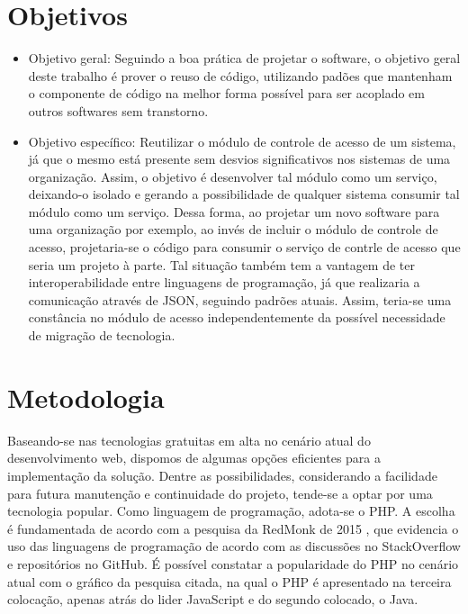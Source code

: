 \section{Objetivos}


\begin{itemize}
	\item Objetivo geral: Seguindo a boa prática de projetar o software, o objetivo geral deste trabalho é prover o reuso de código, utilizando padões que mantenham o componente de código na melhor forma possível para ser acoplado em outros softwares sem transtorno.
	\item Objetivo específico: Reutilizar o módulo de controle de acesso de um sistema, já que o mesmo está presente sem desvios significativos nos sistemas de uma organização. Assim, o objetivo é desenvolver tal módulo como um serviço, deixando-o isolado e gerando a possibilidade de qualquer sistema consumir tal módulo como um serviço. Dessa forma, ao projetar um novo software para uma organização por exemplo, ao invés de incluir o módulo de controle de acesso, projetaria-se o código para consumir o serviço de contrle de acesso que seria um projeto à parte. Tal situação também tem a vantagem de ter interoperabilidade entre linguagens de programação, já que realizaria a comunicação através de JSON, seguindo padrões atuais. Assim, teria-se uma constância no módulo de acesso independentemente da possível necessidade de migração de tecnologia.
\end{itemize}


\section{Metodologia} %


Baseando-se nas tecnologias gratuitas em alta no cenário atual do desenvolvimento web, dispomos de algumas opções eficientes para a implementação da solução. Dentre as possibilidades, considerando a facilidade para futura manutenção e continuidade do projeto, tende-se a optar por uma tecnologia popular. Como linguagem de programação, adota-se o PHP. A escolha é fundamentada de acordo com a pesquisa da RedMonk de 2015 \cite{Grafico-RedMonk} , que evidencia o uso das linguagens de programação de acordo com as discussões no StackOverflow e repositórios no GitHub. É possível constatar a popularidade do PHP no cenário atual com o gráfico da pesquisa citada, na qual o PHP é apresentado na terceira colocação, apenas atrás do lider JavaScript e do segundo colocado, o Java.


